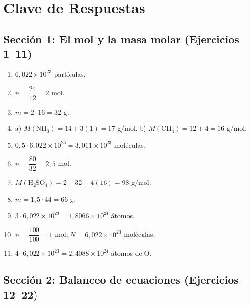 \documentclass[12pt, letterpaper]{article}
\begin{document}
\newpage

\ifmwclaves
  \section{Clave de Respuestas}

  \subsection*{Sección 1: El mol y la masa molar (Ejercicios 1--11)}

  \begin{enumerate}[leftmargin=*, label=\textbf{\arabic*.}]
    \setcounter{enumi}{0}
    \item $6{,}022 \times 10^{23}$ partículas.
    \item $n = \dfrac{24}{12} = 2$ mol.
    \item $m = 2 \cdot 16 = 32$ g.
    \item a) $M(\text{NH}_3) = 14 + 3(1) = 17$ g/mol. \quad b) $M(\text{CH}_4) = 12 + 4 = 16$ g/mol.
    \item $0{,}5 \cdot 6{,}022 \times 10^{23} = 3{,}011 \times 10^{23}$ moléculas.
    \item $n = \dfrac{80}{32} = 2{,}5$ mol.
    \item $M(\text{H}_2\text{SO}_4) = 2 + 32 + 4(16) = 98$ g/mol.
    \item $m = 1{,}5 \cdot 44 = 66$ g.
    \item $3 \cdot 6{,}022 \times 10^{23} = 1{,}8066 \times 10^{24}$ átomos.
    \item $n = \dfrac{100}{100} = 1$ mol; $N = 6{,}022 \times 10^{23}$ moléculas.
    \item $4 \cdot 6{,}022 \times 10^{23} = 2{,}4088 \times 10^{24}$ átomos de O.
  \end{enumerate}

  \subsection*{Sección 2: Balanceo de ecuaciones (Ejercicios 12--22)}
\end{document}
